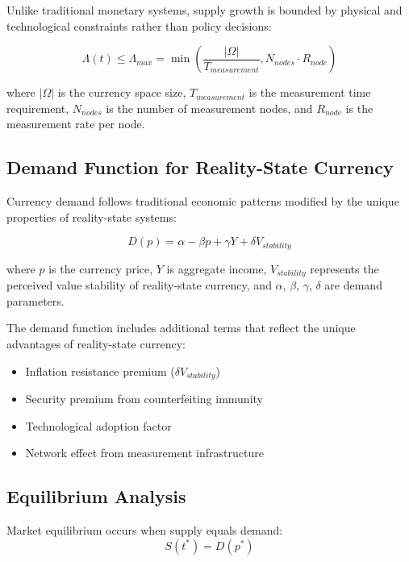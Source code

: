 \documentclass[12pt,a4paper]{article}
\begin{document}
Unlike traditional monetary systems, supply growth is bounded by physical and technological constraints rather than policy decisions:

\begin{equation}
\Lambda(t) \leq \Lambda_{max} = \min\left(\frac{|\Omega|}{T_{measurement}}, N_{nodes} \cdot R_{node}\right)
\end{equation}

where $|\Omega|$ is the currency space size, $T_{measurement}$ is the measurement time requirement, $N_{nodes}$ is the number of measurement nodes, and $R_{node}$ is the measurement rate per node.

\subsection{Demand Function for Reality-State Currency}

Currency demand follows traditional economic patterns modified by the unique properties of reality-state systems:

\begin{equation}
D(p) = \alpha - \beta p + \gamma Y + \delta V_{stability}
\end{equation}

where $p$ is the currency price, $Y$ is aggregate income, $V_{stability}$ represents the perceived value stability of reality-state currency, and $\alpha$, $\beta$, $\gamma$, $\delta$ are demand parameters.

The demand function includes additional terms that reflect the unique advantages of reality-state currency:
\begin{itemize}
\item Inflation resistance premium ($\delta V_{stability}$)
\item Security premium from counterfeiting immunity
\item Technological adoption factor
\item Network effect from measurement infrastructure
\end{itemize}

\subsection{Equilibrium Analysis}

Market equilibrium occurs when supply equals demand:
\begin{equation}
S(t^*) = D(p^*)
\end{equation}
\end{document}
